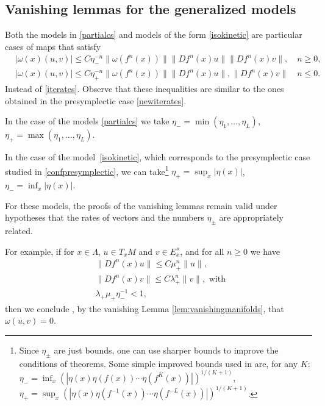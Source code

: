 \documentclass[11pt]{amsart}
\theoremstyle{definition}
\theoremstyle{remark}
\numberwithin{equation}{section}
\begin{document}
\subsection{Vanishing lemmas for the generalized models}
\label{newvanishing}

Both the models in \eqref{partialcs}  and models
of the form \eqref{isokinetic}
are particular cases of  maps that satisfy
\begin{equation}
  \begin{split}
  & |   \omega (x) (u,v)| \le
 C \eta_-^{-n} \|\omega(f^n(x)) \| \| Df^n(x) u\| \| Df^n(x)v\|, \quad n \ge 0,\\
& |  \omega (x)(u,v) | \le C \eta_+^{-n}\|\omega (f^n (x)) \|\| Df^n(x) u\|, \| Df^n(x)v\| \quad n \le 0 .
    \end{split}
\end{equation}
Instead of \eqref{iterates}.
Observe that these inequalities are similar to the ones obtained in the presymplectic case \eqref{newiterates}.

In the case of the models \eqref{partialcs}
we take $\eta_ - = \min(\eta_1,\ldots, \eta_L)$,
$\eta_+ = \max (\eta_1,\ldots, \eta_L)$.

In the case of the model~\eqref{isokinetic}, which corresponds to the presymplectic case studied in \ref{confpresymplectic},
we can take\footnote{
Since $\eta_\pm$ are just bounds, one can use sharper bounds  to improve the conditions of theorems.
Some simple improved bounds used in
\cite{wojtkowski1998conformally} are,  for any $K$:
$\eta_- = \inf_x \left( |\eta(x) \eta(f(x))\cdots \eta(f^K(x))|\right)^{1/(K+1)}$,
$\eta_+ = \sup_x \left( |\eta(x) \eta(f^{-1}(x))\cdots \eta(f^{-L}(x))|\right)^{1/(K+1)}$.
}
$\eta_+ = \sup_x |\eta(x)| $, $\eta_- = \inf_x |\eta(x)|$.



For these models, the proofs of the vanishing lemmas
remain valid under hypotheses that the rates
of vectors  and the numbers $\eta_\pm$ are appropriately related.

For example, if  for $x\in\Lambda$, $u\in T_x M$ and $v\in E^s_x$, and for all $n\ge 0$ we have
\[
\begin{split}
  &\|Df^n(x) u \| \le C  \mu_+^n \|u\|, \\
  & \|Df^n(x) v \| \le C  \lambda_+^n \|v\|, \textrm { with }\\
  &\lambda_+ \mu_+ \eta_-^{-1} < 1 ,
\end{split}
\]
then we conclude , by the vanishing Lemma \ref{lem:vanishingmanifolds}, that  $\omega(u,v) = 0 $.
\end{document}
